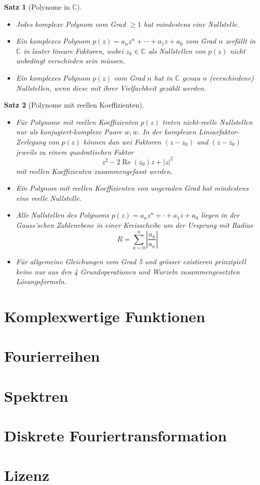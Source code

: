 \documentclass[]{tex/hsrzf}
\newcommand\Cset{\mathbb{C}}
\newcommand\conj[1]{\overline{#1}}
\newcommand\len[1]{\lvert#1\rvert}
\renewcommand\Re{\operatorname{Re}}
\theoremstyle{komfourzf}
\newtheorem{theorem}{Satz}
\begin{document}
\begin{theorem}[Polynome in \(\Cset\)]~ %
  \begin{itemize}
    \item Jedes komplexe Polynom vom Grad \(\geq 1\) hat mindestens eine Nullstelle.

    \item Ein komplexes Polynom \(p(z) = a_n z^n + \cdots + a_1 z + a_0\) vom 
      Grad \(n\) zerf\"allt in \(\Cset\) in lauter lineare Faktoren, wobei \(z_k 
      \in \Cset\) als Nullstellen von \(p(z)\) nicht unbedingt verschieden sein 
      m\"ussen.

    \item Ein komplexes Polynom \(p(z)\) vom Grad \(n\) hat in \(\Cset\) genau 
      \(n\) (verschiedene) Nullstellen, wenn diese mit ihrer Vielfachheit 
      gez\"ahlt werden.
  \end{itemize}
\end{theorem}

\begin{theorem}[Polynome mit reellen Koeffizienten]~ %
  \begin{itemize}
    \item F\"ur Polynome mit reellen Koeffizienten \(p(z)\) treten nicht-reelle 
      Nullstellen nur als \emph{konjugiert-komplexe} Paare \(w, \conj{w}\).
      In der komplexen Linearfaktor-Zerlegung von \(p(z)\) k\"onnen dan wei 
      Faktoren \((z-z_0)\) und \((z-\conj{z_0})\) jeweils zu einem 
      quadratischen Faktor \[
        z^2 - 2 \Re(z_0) z + \len{z}^2
      \] mit \emph{reellen} Koeffizienten zusammengefasst werden.

    \item Ein Polynom mit reellen Koeffizienten von \emph{ungeraden} Grad hat
      mindestens eine \emph{reelle} Nullstelle.

    \item Alle Nullstellen des Polynoms \(p(z) = a_n z^n + \cdot + a_1 z + a_0\)
      liegen in der Gauss'schen Zahlenebene in einer Kreisscheibe um der 
      Ursprung mit Radius \[
        R = \sum_{k=0}^n \left\lvert\frac{a_k}{a_n}\right\rvert
      \]


    \item F\"ur allgemeine Gleichungen vom Grad 5 und gr\"osser existieren 
      prinzipiell \emph{keine} nur aus den 4 Grundoperationen und Wurzeln
      zusammengesetzten L\"osungsformeln.
  \end{itemize}
\end{theorem}

\section{Komplexwertige Funktionen}
\section{Fourierreihen}
\section{Spektren}
\section{Diskrete Fouriertransformation}

\section{Lizenz}
\doclicenseThis
\end{document}

